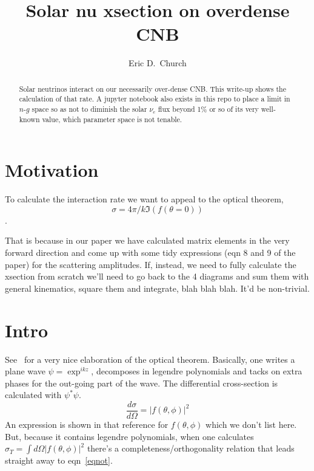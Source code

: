 \documentclass[reprint,onecolumn,superscriptaddress,preprintnumbers]{revtex4}%
\begin{document}
\title{Solar nu xsection on overdense CNB}

\author{Eric D.~Church}


\begin{abstract} 
Solar neutrinos  interact  on our necessarily over-dense CNB. This write-up shows the calculation of that rate. A jupyter notebook also exists in this repo to place a limit in $n$-$g$ space so as not to diminish the solar $\nu_e$ flux beyond 1\% or so of its very well-known value, which parameter space is not tenable.
\end{abstract}
\maketitle

\section{Motivation}

To calculate the interaction rate we want to appeal to the optical theorem, 
\begin{equation}
\sigma = 4\pi/k \Im (f(\theta=0)) \label{eqnot}
\end{equation}. 

That is because in our paper we have calculated matrix elements in the very forward direction and come up with some tidy expressions (eqn 8 and 9 of the paper) for the scattering amplitudes. If, instead, we need to fully calculate the xsection from scratch we'll need to go back to the 4 diagrams and sum them with general kinematics, square them and integrate, blah blah blah. It'd be non-trivial. 

\section{Intro}
See~\cite{optthm} for a very nice elaboration of the optical theorem. Basically, one writes a plane wave $\psi=\exp^{ikz}$, decomposes in legendre polynomials and tacks on extra phases for the out-going part of the wave. The differential cross-section is calculated with $\psi^*\psi$.
\begin{equation}
\frac{d\sigma}{d\Omega} = |f(\theta,\phi)|^2 \label{eqnf2}
\end{equation}
An expression is shown in that reference for $f(\theta,\phi)$ which we don't list here. But, because it contains legendre polynomials, when one calculates $\sigma_T = \int d\Omega |f(\theta,\phi)|^2$ there's a completeness/orthogonality relation that leads straight away to eqn~\ref{eqnot}.
\end{document}
